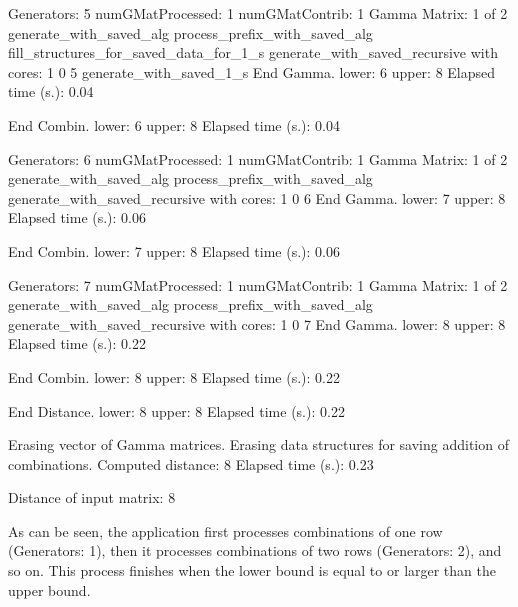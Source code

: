 \documentclass[]{article}
\newenvironment{Shaded}{}{}
\newcommand{\BuiltInTok}[1]{#1}
\newcommand{\ExtensionTok}[1]{#1}
\newcommand{\NormalTok}[1]{#1}
\begin{document}
\begin{Shaded}
\begin{Highlighting}[]
  \ExtensionTok{Generators}\NormalTok{: 5}
  \ExtensionTok{numGMatProcessed}\NormalTok{: 1}
  \ExtensionTok{numGMatContrib}\NormalTok{:   1}
    \ExtensionTok{Gamma}\NormalTok{ Matrix: 1 of 2 }
    \ExtensionTok{generate_with_saved_alg}
    \ExtensionTok{process_prefix_with_saved_alg}
    \ExtensionTok{fill_structures_for_saved_data_for_1_s}
    \ExtensionTok{generate_with_saved_recursive}\NormalTok{ with cores: 1  0 5}
    \ExtensionTok{generate_with_saved_1_s}
    \ExtensionTok{End}\NormalTok{ Gamma. lower:  6  upper:  8        Elapsed time (s.)}\BuiltInTok{:}\NormalTok{ 0.04}

  \ExtensionTok{End}\NormalTok{ Combin.  lower:  6  upper:  8        Elapsed time (s.)}\BuiltInTok{:}\NormalTok{ 0.04}

  \ExtensionTok{Generators}\NormalTok{: 6}
  \ExtensionTok{numGMatProcessed}\NormalTok{: 1}
  \ExtensionTok{numGMatContrib}\NormalTok{:   1}
    \ExtensionTok{Gamma}\NormalTok{ Matrix: 1 of 2 }
    \ExtensionTok{generate_with_saved_alg}
    \ExtensionTok{process_prefix_with_saved_alg}
    \ExtensionTok{generate_with_saved_recursive}\NormalTok{ with cores: 1  0 6}
    \ExtensionTok{End}\NormalTok{ Gamma. lower:  7  upper:  8        Elapsed time (s.)}\BuiltInTok{:}\NormalTok{ 0.06}

  \ExtensionTok{End}\NormalTok{ Combin.  lower:  7  upper:  8        Elapsed time (s.)}\BuiltInTok{:}\NormalTok{ 0.06}

  \ExtensionTok{Generators}\NormalTok{: 7}
  \ExtensionTok{numGMatProcessed}\NormalTok{: 1}
  \ExtensionTok{numGMatContrib}\NormalTok{:   1}
    \ExtensionTok{Gamma}\NormalTok{ Matrix: 1 of 2 }
    \ExtensionTok{generate_with_saved_alg}
    \ExtensionTok{process_prefix_with_saved_alg}
    \ExtensionTok{generate_with_saved_recursive}\NormalTok{ with cores: 1  0 7}
    \ExtensionTok{End}\NormalTok{ Gamma. lower:  8  upper:  8        Elapsed time (s.)}\BuiltInTok{:}\NormalTok{ 0.22}

  \ExtensionTok{End}\NormalTok{ Combin.  lower:  8  upper:  8        Elapsed time (s.)}\BuiltInTok{:}\NormalTok{ 0.22}

\ExtensionTok{End}\NormalTok{ Distance.  lower:  8  upper:  8        Elapsed time (s.)}\BuiltInTok{:}\NormalTok{ 0.22}

\ExtensionTok{Erasing}\NormalTok{ vector of Gamma matrices.}
\ExtensionTok{Erasing}\NormalTok{ data structures for saving addition of combinations.}
\ExtensionTok{Computed}\NormalTok{ distance: 8     Elapsed time (s.)}\BuiltInTok{:}\NormalTok{ 0.23}



\ExtensionTok{Distance}\NormalTok{ of input matrix:  8 }
\end{Highlighting}
\end{Shaded}

As can be seen, the application first processes combinations of one row
(Generators: 1), then it processes combinations of two rows (Generators:
2), and so on. This process finishes when the lower bound is equal to or
larger than the upper bound.
\end{document}
